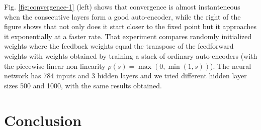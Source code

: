 \documentclass{article}
\begin{document}
Fig. \ref{fig:convergence-1} (left) shows that convergence is almost instanteneous when the consecutive layers form a
good auto-encoder, while the right of the figure shows that not only does it start closer to the fixed point but
it approaches it exponentially at a faster rate. That experiment compares randomly initialized weights
where the feedback weights equal the transpose of the feedforward weights with weights obtained by training
a stack of ordinary auto-encoders (with the piecewise-linear non-linearity $\rho(s)=\max(0,\min(1,s))$).
The neural network has 784 inputs and 3 hidden layers and we tried different hidden layer sizes 500 and 1000, with the
same results obtained.
\iffalse
We have also run the same code on 6 hidden layers and obtained similarly fast convergence, which suggests
that this auto-encoder constraint followed by feedforward initialization
avoids the issue of slowing convergence as the number of layers increased,
observed by~\citet{Scellier+Bengio-arxiv2016}.
\fi

\iffalse
\subsection{Biological Implementation}

\section{Related Work}

\cite{Scellier+Bengio-arxiv2016}

\citep{Xie+Seung-2003}

\section{Experimental Validation}
\fi

\section{Conclusion}
\end{document}
